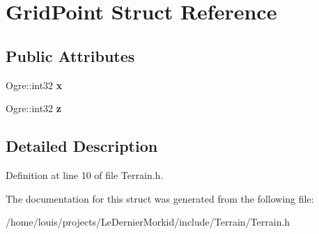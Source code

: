 \hypertarget{struct_grid_point}{}\section{Grid\+Point Struct Reference}
\label{struct_grid_point}
\subsection*{Public Attributes}
\begin{DoxyCompactItemize}
\item 
\mbox{\label{struct_grid_point_a6a2d6291fb359df17bdcce483c8283ee}} 
Ogre\+::int32 {\bfseries x}
\item 
\mbox{\label{struct_grid_point_a99f578ff1addf4e0ecd9c425f271a915}} 
Ogre\+::int32 {\bfseries z}
\end{DoxyCompactItemize}


\subsection{Detailed Description}


Definition at line 10 of file Terrain.\+h.



The documentation for this struct was generated from the following file\+:\begin{DoxyCompactItemize}
\item 
/home/louis/projects/\+Le\+Dernier\+Morkid/include/\+Terrain/Terrain.\+h\end{DoxyCompactItemize}
